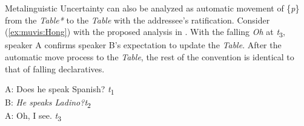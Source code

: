 \documentclass[output=paper,colorlinks,citecolor=brown]{langscibook}
\begin{document}
Metalinguistic Uncertainty  can also be analyzed as automatic movement of \{\textit{p}\} from the \textit{Table*} to the \textit{Table} with the addressee’s ratification. Consider (\ref{ex:muvis:Hong}) with the proposed analysis in . With the falling \textit{Oh} at \textit{t}\textsubscript{3}, speaker A confirms speaker B’s expectation to update the \textit{Table}. After the automatic move process to the \textit{Table}, the rest of the convention is identical to that of falling declaratives.

\ea \label{ex:muvis:Hong}
    A: Does he speak Spanish? \hfill \textit{t}\textsubscript{1}\\
    B: \textit{He speaks Ladino?}\hfill \textit{t}\textsubscript{2}\\
    A: Oh, I see. \hfill \textit{t}\textsubscript{3}\\
\renewcommand\tabularxcolumn[1]{m{#1}}
\end{document}
